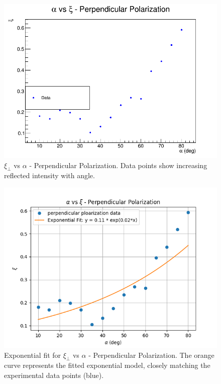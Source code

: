 \documentclass[journal]{IEEEtran}
\begin{document}
\begin{figure}[H]
    \centering
    \includegraphics[width=\linewidth]{../plots/perpendicular_plot.png}
    \caption{$\xi_{\perp}$ vs $\alpha$ - Perpendicular Polarization. Data points show increasing reflected intensity with angle.}
    \label{fig:perpendicular}
\end{figure}
\begin{figure}[H]
    \centering
    \includegraphics[width=\linewidth]{../plots/exponential_fit.png}
    \caption{Exponential fit for $\xi_{\perp}$ vs $\alpha$ - Perpendicular Polarization. The orange curve represents the fitted exponential model, closely matching the experimental data points (blue).}
    \label{fig:exponential_fit}
\end{figure}
\end{document}

